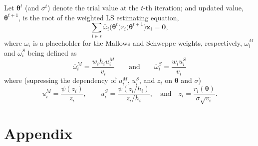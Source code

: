 \documentclass[a4paper,11pt]{scrreprt}
\begin{document}
Let $\bm \theta^{t}$ (and $\sigma^{t}$) denote the trial value at the $t$-th iteration; and updated value, $\bm \theta^{t+1}$, is the root of the weighted LS estimating equation, 
\begin{equation}
   \sum_{i \in s} \overline{\omega}_i \big( \bm \theta^t\big) r_i\big(\bm \theta^{t+1}\big) \bm x_i = \bm 0, 
\end{equation}
\noindent where $\overline{\omega}_i$ is a placeholder for the Mallows and Schweppe weights, respectively, $\overline{\omega}_i^M$ and $\overline{\omega}_i^S$ being defined as  
\begin{equation}
   \overline{\omega}_i^M = \frac{w_i h_i u_i^M}{v_i} \qquad \text{and} \qquad  \overline{\omega}_i^S = \frac{w_i u_i^S}{v_i} 
\end{equation}
\noindent where (supressing the dependency of $u_i^M$, $u_i^S$, and $z_i$ on $\bm \theta$ and $\sigma$) 
\begin{equation}
   u_i^M = \frac{\psi(z_i)}{z_i}, \qquad  u_i^S = \frac{\psi(z_i/h_i)}{z_i/h_i}, \quad \text{and} \quad z_i = \frac{r_i(\bm \theta)}{\sigma \sqrt{v_i}}.
\end{equation}


{
\singlespacing


}


\appendix
\chapter{Appendix}

 
\end{document}
